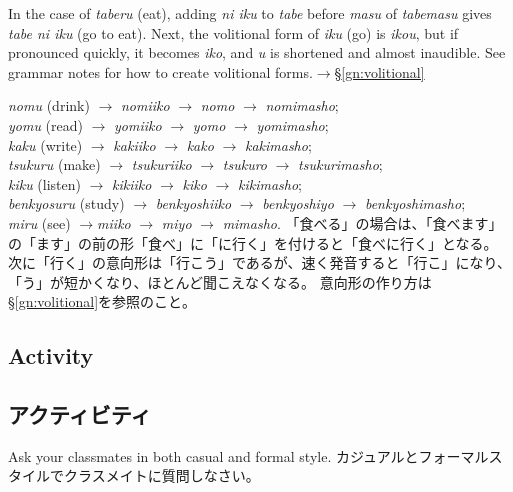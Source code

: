 \documentclass[uplatex,dvipdfmx,b5paper,english,10pt]{jsbook}
\begin{document}
\begin{toianswer}
\ifEnglish
In the case of {\it taberu\/} (eat), adding {\it ni iku\/} to {\it tabe\/} before {\it masu\/} of {\it tabemasu\/} gives {\it tabe ni iku\/} (go to eat).
Next, the volitional form of {\it iku\/} (go) is {\it ikou\/}, but if pronounced quickly, it becomes {\it iko\/}, and {\it u\/} is shortened and almost inaudible.
See grammar notes for how to create volitional forms.$\rightarrow$\S\ref{gn:volitional}

 {\it nomu\/} (drink) $\rightarrow$ {\it nomiiko\/} $\rightarrow$ {\it nomo\/} $\rightarrow$ {\it nomimasho\/};\\
 {\it yomu\/} (read) $\rightarrow$ {\it yomiiko\/} $\rightarrow$ {\it yomo\/} $\rightarrow$ {\it yomimasho\/};\\
 {\it kaku\/} (write) $\rightarrow$ {\it kakiiko\/} $\rightarrow$ {\it kako\/} $\rightarrow$ {\it kakimasho\/};\\
 {\it tsukuru\/} (make) $\rightarrow$ {\it tsukuriiko\/} $\rightarrow$ {\it tsukuro\/} $\rightarrow$ {\it tsukurimasho\/};\\
 {\it kiku\/} (listen) $\rightarrow$ {\it kikiiko\/} $\rightarrow$ {\it kiko\/} $\rightarrow$ {\it kikimasho\/};\\
 {\it benkyosuru\/} (study) $\rightarrow$ {\it benkyoshiiko\/} $\rightarrow$ {\it benkyoshiyo\/} $\rightarrow$ {\it benkyoshimasho\/};\\
 {\it miru\/} (see) $\rightarrow${\it miiko\/} $\rightarrow$ {\it miyo\/} $\rightarrow$ {\it mimasho\/}.
\else
「食べる」の場合は、「食べます」の「ます」の前の形「食べ」に「に行く」を付けると「食べに行く」となる。
次に「行く」の意向形は「行こう」であるが、速く発音すると「行こ」になり、「う」が短かくなり、ほとんど聞こえなくなる。
意向形の作り方は\S\ref{gn:volitional}を参照のこと。
\fi
\end{toianswer}

\ifEnglish
\subsection{Activity}
\else
\subsection{アクティビティ}
\fi

\begin{toiquestion}
\ifEnglish
Ask your classmates in both casual and formal style.
\else
カジュアルとフォーマルスタイルでクラスメイトに質問しなさい。
\fi
\end{toiquestion}
\end{document}
